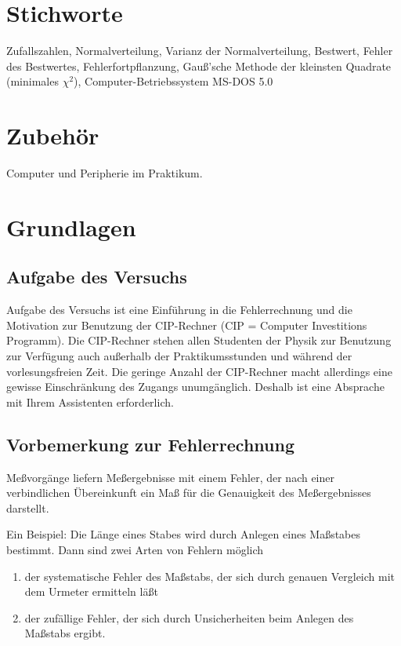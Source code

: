 \section{Stichworte}

Zufallszahlen, Normalverteilung, Varianz der Normalverteilung,
Bestwert, Fehler des Bestwertes, Fehlerfortpflanzung, Gauß'sche
Methode der kleinsten Quadrate (minimales $\chi^2$),
Computer-Betriebssystem MS-DOS 5.0

\section{Zubehör}

Computer und Peripherie im Praktikum.




\section{Grundlagen}

\subsection{Aufgabe des Versuchs}

Aufgabe des Versuchs ist eine Einführung in die Fehlerrechnung und die
Motivation zur Benutzung der CIP-Rechner (CIP = Computer Investitions
Programm). Die CIP-Rechner stehen allen Studenten der Physik zur
Benutzung zur Verfügung auch außerhalb der Praktikumsstunden und
während der vorlesungsfreien Zeit. Die geringe Anzahl der CIP-Rechner
macht allerdings eine gewisse Einschränkung des Zugangs unumgänglich.
Deshalb ist eine Absprache mit Ihrem Assistenten erforderlich.

\subsection{Vorbemerkung zur Fehlerrechnung}

Meßvorgänge liefern Meßergebnisse mit einem Fehler, der nach einer
verbindlichen Übereinkunft ein Maß für die Genauigkeit des
Meßergebnisses darstellt.

Ein Beispiel: Die Länge eines Stabes wird durch Anlegen eines Maßstabes
bestimmt. Dann sind zwei Arten von Fehlern möglich

\begin{enumerate}
  \item der systematische Fehler des Maßstabs, der sich durch genauen Vergleich mit dem Urmeter ermitteln läßt
  \item der zufällige Fehler, der sich durch Unsicherheiten beim Anlegen des
 Maßstabs ergibt.
\end{enumerate}

